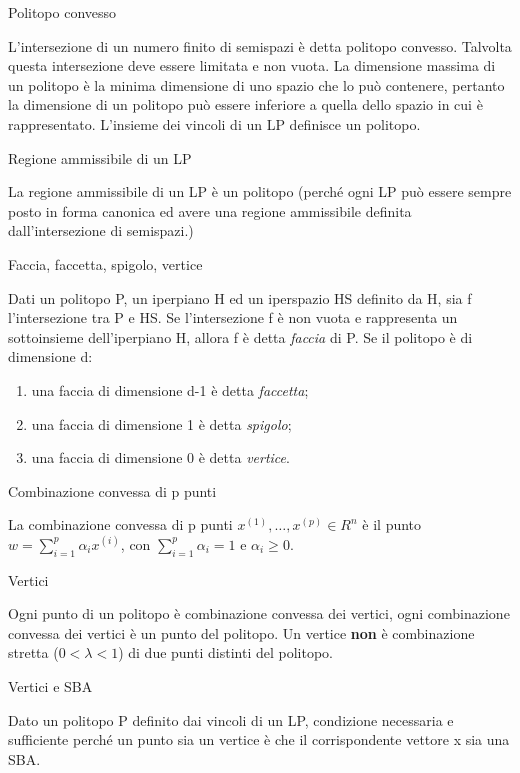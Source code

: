 \documentclass[answers, a4paper, 11pt]{exam}
\begin{document}
\begin{questions}
\begin{solution}
\end{solution}
\question Politopo convesso
\begin{solution}
L'intersezione di un numero finito di semispazi è detta politopo convesso. Talvolta questa intersezione deve essere limitata e non vuota. La dimensione massima di un politopo è la minima dimensione di uno spazio che lo può contenere, pertanto la dimensione di un politopo può essere inferiore a quella dello spazio in cui è rappresentato. L'insieme dei vincoli di un LP definisce un politopo.
\end{solution}
\question Regione ammissibile di un LP
\begin{solution}
La regione ammissibile di un LP è un politopo (perché ogni LP può essere sempre posto in forma canonica ed avere una regione ammissibile definita dall'intersezione di semispazi.)
\end{solution}
\question Faccia, faccetta, spigolo, vertice
\begin{solution}
Dati un politopo P, un iperpiano H ed un iperspazio HS definito da H, sia f l'intersezione tra P e HS. Se l'intersezione f è non vuota e rappresenta un sottoinsieme dell'iperpiano H, allora f è detta \emph{faccia} di P.
Se il politopo è di dimensione d:
\begin{enumerate}
\item una faccia di dimensione d-1 è detta \emph{faccetta};
\item una faccia di dimensione 1 è detta \emph{spigolo};
\item una faccia di dimensione 0 è detta \emph{vertice}.
\end{enumerate}
\end{solution}
\question Combinazione convessa di p punti
\begin{solution}
La combinazione convessa di p punti $x^{(1)}, \ldots , x^{(p)} \in R^{n}$ è il punto $w = \sum_{i=1}^p \alpha_{i} x^{(i)}$, con $\sum_{i=1}^p \alpha_{i} = 1$ e $\alpha_{i} \ge 0$.
\end{solution}
\question Vertici 
\begin{solution}
Ogni punto di un politopo è combinazione convessa dei vertici, ogni combinazione convessa dei vertici è un punto del politopo. Un vertice \textbf{non} è combinazione stretta ($0< \lambda <1$) di due punti distinti del politopo.
\end{solution}
\question Vertici e SBA
\begin{solution}
Dato un politopo P definito dai vincoli di un LP, condizione necessaria e sufficiente perché un punto sia un vertice è che il corrispondente vettore x sia una SBA.

\end{solution}
\end{questions}
\end{document}
